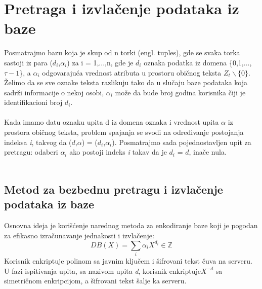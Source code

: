 \documentclass[a4paper]{article}
\begin{document}
\section{Pretraga i izvlačenje podataka iz baze}
Posmatrajmo bazu koja je skup od n torki (engl. tuples), gde se svaka torka sastoji iz para ($d_i$,$\alpha_i$) za i = 1,...,n, gde je $d_i$ oznaka podatka iz domena \{0,1,...,$\tau-1$\}, a $\alpha_i$ odgovarajuća vrednost atributa u prostoru običnog teksta $Z_t \backslash \{0\}$. Želimo da se sve oznake teksta razlikuju tako da u slučaju baze podataka koja sadrži informacije o nekoj osobi, $\alpha_i$ može da bude broj godina korisnika čiji je identifikacioni broj $d_i$.\\\\
Kada imamo datu oznaku upita d iz domena oznaka i vrednost upita $\alpha$ iz prostora običnog teksta, problem spajanja se svodi na određivanje postojanja indeksa \textit{i}, takvog da ($d$,$\alpha$) = ($d_i$,$\alpha_i$). Posmatrajmo sada pojednostavljen upit za pretragu: odaberi $\alpha_i$ ako postoji indeks \textit{i} takav da je $d_i$ = $d$, inače nula.\\\\

\subsection{Metod za bezbednu pretragu i izvlačenje podataka iz baze}
Osnovna ideja je korišćenje narednog metoda za enkodiranje baze koji je pogodan za efikasno izračunavanje jednakosti i izvlačenje:
	$$DB(X) = \sum_{i} \alpha_i X^{d_i} \in \mathbb{Z}$$ 
Korisnik enkriptuje polinom sa javnim ključem i šifrovani tekst čuva na serveru. U fazi ispitivanja upita, sa nazivom upita \textit{d}, korisnik enkriptuje$X^{-d}$ sa simetričnom enkripcijom, a šifrovani tekst šalje ka serveru.
\end{document}
